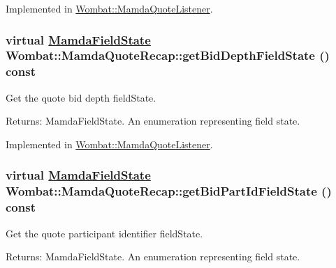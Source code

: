 Implemented in \hyperlink{classWombat_1_1MamdaQuoteListener_00ecbc2964d5439e77d04ffc2d00d9e9}{Wombat::Mamda\-Quote\-Listener}.\hypertarget{classWombat_1_1MamdaQuoteRecap_8b4a8fdf6c777bfe1ff3b2161e7b0c08}{
\subsubsection[getBidDepthFieldState]{\setlength{\rightskip}{0pt plus 5cm}virtual \hyperlink{namespaceWombat_93aac974f2ab713554fd12a1fa3b7d2a}{Mamda\-Field\-State} Wombat::Mamda\-Quote\-Recap::get\-Bid\-Depth\-Field\-State () const}}
\label{classWombat_1_1MamdaQuoteRecap_8b4a8fdf6c777bfe1ff3b2161e7b0c08}


Get the quote bid depth field\-State. 

\begin{Desc}
\item[Returns:]Mamda\-Field\-State. An enumeration representing field state. \end{Desc}


Implemented in \hyperlink{classWombat_1_1MamdaQuoteListener_98c0e8e6190f6cb27684fd9abcf4a356}{Wombat::Mamda\-Quote\-Listener}.\hypertarget{classWombat_1_1MamdaQuoteRecap_879a1c9f6eb10c6b0a78db53c8e2eb89}{
\subsubsection[getBidPartIdFieldState]{\setlength{\rightskip}{0pt plus 5cm}virtual \hyperlink{namespaceWombat_93aac974f2ab713554fd12a1fa3b7d2a}{Mamda\-Field\-State} Wombat::Mamda\-Quote\-Recap::get\-Bid\-Part\-Id\-Field\-State () const}}
\label{classWombat_1_1MamdaQuoteRecap_879a1c9f6eb10c6b0a78db53c8e2eb89}


Get the quote participant identifier field\-State. 

\begin{Desc}
\item[Returns:]Mamda\-Field\-State. An enumeration representing field state. \end{Desc}


